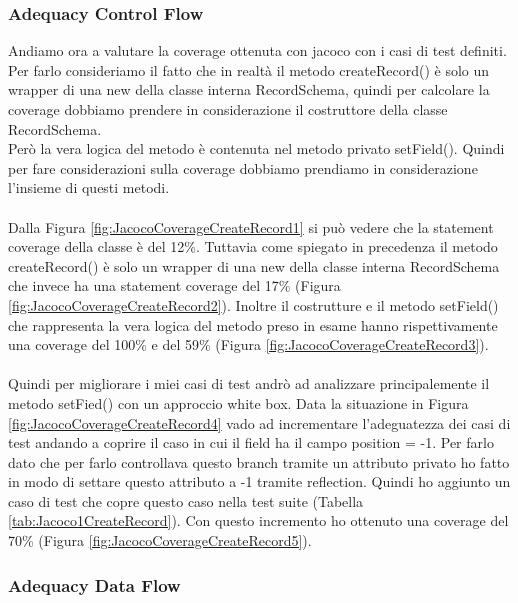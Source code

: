 \documentclass[10pt, a4paper]{article}
\begin{document}
\subsubsection{Adequacy Control Flow}

Andiamo ora a valutare la coverage ottenuta con jacoco con i casi di test definiti. Per farlo consideriamo il fatto
che in realtà il metodo createRecord() è solo un wrapper di una new della classe interna RecordSchema, quindi per calcolare
la coverage dobbiamo prendere in considerazione il costruttore della classe RecordSchema. \\ Però la vera logica del metodo
è contenuta nel metodo privato setField(). Quindi per fare considerazioni sulla coverage dobbiamo prendiamo in considerazione 
l'insieme di questi metodi. \\ \\
Dalla Figura \ref{fig:JacocoCoverageCreateRecord1} si può vedere che la statement coverage della classe è del 12\%. Tuttavia come 
spiegato in precedenza il metodo createRecord() è solo un wrapper di una new della classe interna RecordSchema che invece ha una
statement coverage del 17\% (Figura \ref{fig:JacocoCoverageCreateRecord2}). Inoltre il costrutture e il metodo setField() 
che rappresenta la vera logica del metodo preso in esame hanno rispettivamente una coverage del 100\% e del 59\% 
(Figura \ref{fig:JacocoCoverageCreateRecord3}). \\ \\
Quindi per migliorare i miei casi di test andrò ad analizzare principalemente il metodo setFied() con un approccio white box.
Data la situazione in Figura \ref{fig:JacocoCoverageCreateRecord4} vado ad incrementare l'adeguatezza dei casi di test
andando a coprire il caso in cui il field ha il campo position = -1. Per farlo dato che per farlo controllava questo branch 
tramite un attributo privato ho fatto in modo di settare questo attributo a -1 tramite reflection.
Quindi ho aggiunto un caso di test che copre questo caso nella test suite (Tabella \ref{tab:Jacoco1CreateRecord}).
Con questo incremento ho ottenuto una coverage del 70\% (Figura \ref{fig:JacocoCoverageCreateRecord5}).


\subsubsection{Adequacy Data Flow}
\end{document}
